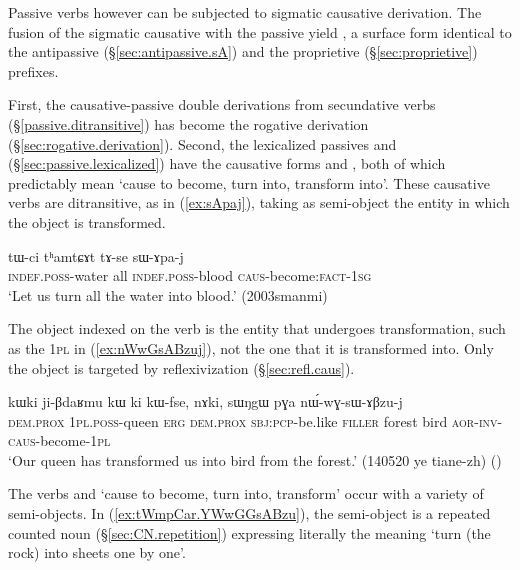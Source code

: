 Passive verbs however can be subjected to sigmatic causative derivation. The fusion of the sigmatic causative  with the passive  yield , a surface form identical to the antipassive (§\ref{sec:antipassive.sA}) and the proprietive (§\ref{sec:proprietive}) prefixes.
 
First, the causative-passive double derivations from secundative verbs (§\ref{passive.ditransitive}) has become the rogative derivation (§\ref{sec:rogative.derivation}).  Second, the lexicalized passives  and  (§\ref{sec:passive.lexicalized}) have the causative forms  and , both of which predictably mean `cause to become, turn into, transform into'. These causative verbs are ditransitive, as in (\ref{ex:sApaj}), taking as semi-object the entity in which the object is transformed.

\begin{exe}
\ex \label{ex:sApaj}
\gll tɯ-ci tʰamtɕɤt tɤ-se sɯ-ɤpa-j \\
\textsc{indef}.\textsc{poss}-water all \textsc{indef}.\textsc{poss}-blood \textsc{caus}-become:\textsc{fact}-\textsc{1sg} \\
\glt `Let us turn all the water into blood.' (2003smanmi)
\end{exe} 

The object indexed on the verb is the entity that undergoes transformation, such as the \textsc{1pl} in (\ref{ex:nWwGsABzuj}), not the one that it is transformed into. Only the object is targeted by reflexivization (§\ref{sec:refl.caus}). 

\begin{exe}
\ex \label{ex:nWwGsABzuj}
\gll kɯki ji-βdaʁmu kɯ ki kɯ-fse, nɤki, sɯŋgɯ pɣa nɯ́-wɣ-sɯ-ɤβzu-j \\
\textsc{dem}.\textsc{prox} \textsc{1pl}.\textsc{poss}-queen \textsc{erg} \textsc{dem}.\textsc{prox} \textsc{sbj}:\textsc{pcp}-be.like \textsc{filler} forest bird \textsc{aor}-\textsc{inv}-\textsc{caus}-become-\textsc{1pl} \\
\glt `Our queen has transformed us into bird from the forest.' (140520 ye tiane-zh)
()
\end{exe} 

The verbs  and  `cause to become, turn into, transform' occur with a variety of semi-objects. In (\ref{ex:tWmpCar.YWwGGsABzu}), the semi-object  is a repeated counted noun (§\ref{sec:CN.repetition}) expressing literally the meaning `turn (the rock) into sheets one by one'. 

